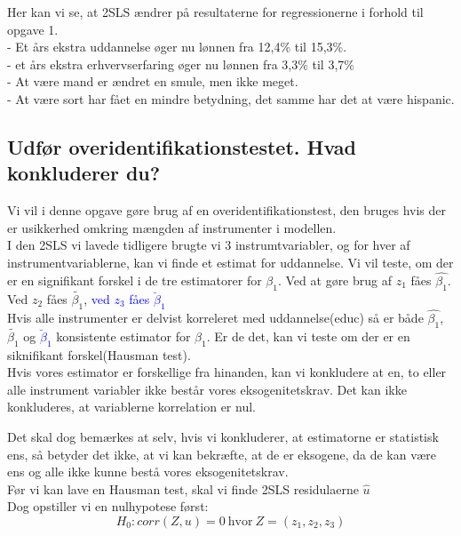 \documentclass[
  10pt,
]{article}
\begin{document}
Her kan vi se, at 2SLS ændrer på resultaterne for regressionerne i
forhold til opgave 1.\\
- Et års ekstra uddannelse øger nu lønnen fra 12,4\% til 15,3\%.\\
- et års ekstra erhvervserfaring øger nu lønnen fra 3,3\% til 3,7\%\\
- At være mand er ændret en smule, men ikke meget.\\
- At være sort har fået en mindre betydning, det samme har det at være
hispanic.\\

\hypertarget{udfuxf8r-overidentifikationstestet.-hvad-konkluderer-du}{%
\subsection{Udfør overidentifikationstestet. Hvad konkluderer
du?}\label{udfuxf8r-overidentifikationstestet.-hvad-konkluderer-du}}

Vi vil i denne opgave gøre brug af en overidentifikationstest, den
bruges hvis der er usikkerhed omkring mængden af instrumenter i
modellen.\\
I den 2SLS vi lavede tidligere brugte vi 3 instrumtvariabler, og for
hver af instrumentvariablerne, kan vi finde et estimat for uddannelse.
Vi vil teste, om der er en signifikant forskel i de tre estimatorer for
\(\beta_1\). Ved at gøre brug af \(z_1\) fåes \(\hat{\beta_1}\). Ved
\(z_2\) fåes \(\tilde{\beta_1}\),
\textcolor{blue}{ved $z_3$ fåes $\breve\beta_1$}\\

Hvis alle instrumenter er delvist korreleret med uddannelse(educ) så er
både \(\hat{\beta_1}\), \(\tilde{\beta_1}\) og
\textcolor{blue}{$\breve\beta_1$} konsistente estimator for \(\beta_1\).
Er de det, kan vi teste om der er en siknifikant forskel(Hausman
test).\\

Hvis vores estimator er forskellige fra hinanden, kan vi konkludere at
en, to eller alle instrument variabler ikke består vores
eksogenitetskrav. Det kan ikke konkluderes, at variablerne korrelation
er nul. ~

Det skal dog bemærkes at selv, hvis vi konkluderer, at estimatorne er
statistisk ens, så betyder det ikke, at vi kan bekræfte, at de er
eksogene, da de kan være ens og alle ikke kunne bestå vores
eksogenitetskrav.\\

Før vi kan lave en Hausman test, skal vi finde 2SLS residulaerne
\(\hat{u}\)\\
Dog opstiller vi en nulhypotese først:
\[H_0: corr(Z,u)=0\ \text{hvor}\ Z=(z_1, z_2, z_3)\]
\end{document}
